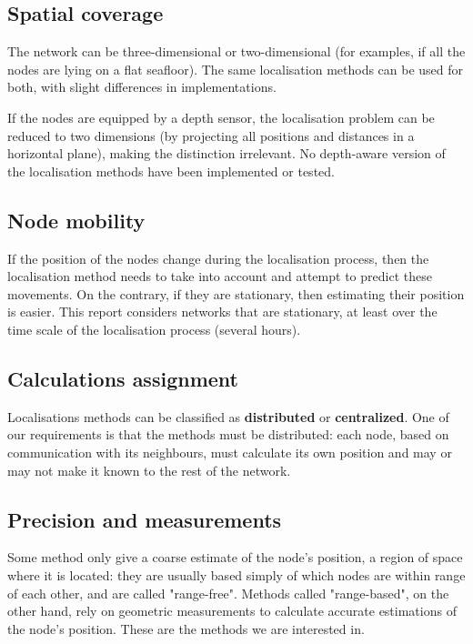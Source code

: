 \documentclass[12pt,a4paper,fleqn]{report}
\begin{document}
\subsection{Spatial coverage}

The network can be three-dimensional or two-dimensional (for examples, if all the nodes are lying on a flat seafloor). The same localisation methods can be used for both, with slight differences in implementations.

If the nodes are equipped by a depth sensor, the localisation problem can be reduced to two dimensions (by projecting all positions and distances in a horizontal plane), making the distinction irrelevant. No depth-aware version of the localisation methods have been implemented or tested.

\subsection{Node mobility}

If the position of the nodes change during the localisation process, then the localisation method needs to take into account and attempt to predict these movements. On the contrary, if they are stationary, then estimating their position is easier. This report considers networks that are stationary, at least over the time scale of the localisation process (several hours).

\subsection{Calculations assignment}

Localisations methods can be classified as \textbf{distributed} or \textbf{centralized}. One of our requirements is that the methods must be distributed: each node, based on communication with its neighbours, must calculate its own position and may or may not make it known to the rest of the network.

\subsection{Precision and measurements}

Some method only give a coarse estimate of the node's position, a region of space where it is located: they are usually based simply of which nodes are within range of each other, and are called "range-free". Methods called "range-based", on the other hand, rely on geometric measurements to calculate accurate estimations of the node's position. These are the methods we are interested in.
\end{document}
